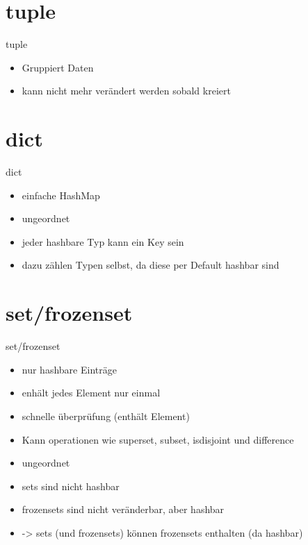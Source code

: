\section{tuple}
\begin{frame}{tuple}
\begin{itemize}
	\item Gruppiert Daten
	\item kann nicht mehr verändert werden sobald kreiert
\end{itemize}

\end{frame}

\section{dict}
\begin{frame}{dict}
\begin{itemize}
	\item einfache HashMap
	\item ungeordnet
	\item jeder hashbare Typ kann ein Key sein
	\item dazu zählen Typen selbst, da diese per Default hashbar sind
\end{itemize}

\end{frame}

\section{set/frozenset}
\begin{frame}{set/frozenset}
\begin{itemize}
	\item nur hashbare Einträge
	\item enhält jedes Element nur einmal
	\item schnelle  überprüfung (enthält Element)
	\item Kann operationen wie superset, subset, isdisjoint und difference 
	\item ungeordnet
	\item sets sind nicht hashbar
	\item frozensets sind nicht veränderbar, aber hashbar
	\item -> sets (und frozensets) können frozensets enthalten (da hashbar)
\end{itemize}

\end{frame}


